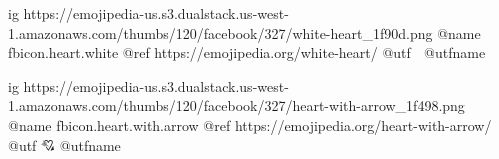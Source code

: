  
 
 
 
 

\ifcmt
	ig https://emojipedia-us.s3.dualstack.us-west-1.amazonaws.com/thumbs/120/facebook/327/white-heart_1f90d.png
	@name fbicon.heart.white
	@ref https://emojipedia.org/white-heart/
	@utf 🤍
	@utfname

	ig https://emojipedia-us.s3.dualstack.us-west-1.amazonaws.com/thumbs/120/facebook/327/heart-with-arrow_1f498.png
	@name fbicon.heart.with.arrow
	@ref https://emojipedia.org/heart-with-arrow/
	@utf 💘
	@utfname
	
\fi
